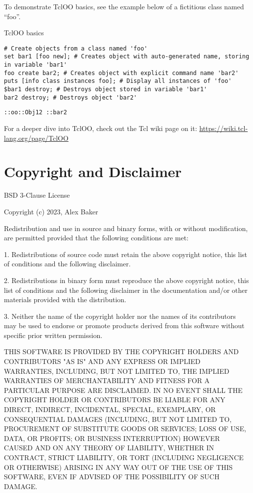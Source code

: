 To demonstrate TclOO basics, see the example below of a fictitious class named ``foo''.
\begin{example}{TclOO basics}
\begin{lstlisting}
# Create objects from a class named 'foo'
set bar1 [foo new]; # Creates object with auto-generated name, storing in variable 'bar1'
foo create bar2; # Creates object with explicit command name 'bar2'
puts [info class instances foo]; # Display all instances of 'foo'
$bar1 destroy; # Destroys object stored in variable 'bar1'
bar2 destroy; # Destroys object 'bar2'
\end{lstlisting}
\tcblower
\begin{lstlisting}
::oo::Obj12 ::bar2
\end{lstlisting}
\end{example}
For a deeper dive into TclOO, check out the Tcl wiki page on it: \url{https://wiki.tcl-lang.org/page/TclOO}

\cleartooddpage[\thispagestyle{empty}]
\section{Copyright and Disclaimer}
BSD 3-Clause License

Copyright (c) 2023, Alex Baker

Redistribution and use in source and binary forms, with or without
modification, are permitted provided that the following conditions are met:

1. Redistributions of source code must retain the above copyright notice, this
   list of conditions and the following disclaimer.

2. Redistributions in binary form must reproduce the above copyright notice,
   this list of conditions and the following disclaimer in the documentation
   and/or other materials provided with the distribution.

3. Neither the name of the copyright holder nor the names of its
   contributors may be used to endorse or promote products derived from
   this software without specific prior written permission.

THIS SOFTWARE IS PROVIDED BY THE COPYRIGHT HOLDERS AND CONTRIBUTORS "AS IS"
AND ANY EXPRESS OR IMPLIED WARRANTIES, INCLUDING, BUT NOT LIMITED TO, THE
IMPLIED WARRANTIES OF MERCHANTABILITY AND FITNESS FOR A PARTICULAR PURPOSE ARE
DISCLAIMED. IN NO EVENT SHALL THE COPYRIGHT HOLDER OR CONTRIBUTORS BE LIABLE
FOR ANY DIRECT, INDIRECT, INCIDENTAL, SPECIAL, EXEMPLARY, OR CONSEQUENTIAL
DAMAGES (INCLUDING, BUT NOT LIMITED TO, PROCUREMENT OF SUBSTITUTE GOODS OR
SERVICES; LOSS OF USE, DATA, OR PROFITS; OR BUSINESS INTERRUPTION) HOWEVER
CAUSED AND ON ANY THEORY OF LIABILITY, WHETHER IN CONTRACT, STRICT LIABILITY,
OR TORT (INCLUDING NEGLIGENCE OR OTHERWISE) ARISING IN ANY WAY OUT OF THE USE
OF THIS SOFTWARE, EVEN IF ADVISED OF THE POSSIBILITY OF SUCH DAMAGE.
